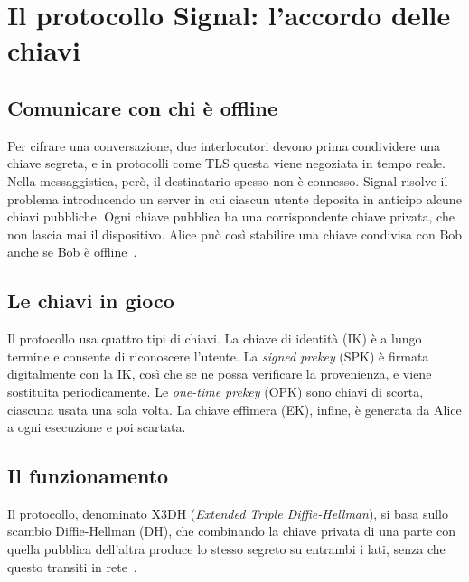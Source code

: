 \section{Il protocollo Signal: l'accordo delle chiavi}\label{sec:AccordoChiavi}

\subsection{Comunicare con chi è offline}\label{sec:offline}

Per cifrare una conversazione, due interlocutori devono prima condividere una chiave
segreta, e in protocolli come TLS questa viene negoziata in tempo reale. Nella
messaggistica, però, il destinatario spesso non è connesso. Signal risolve il problema
introducendo un server in cui ciascun utente deposita in anticipo alcune chiavi
pubbliche. Ogni chiave pubblica ha una corrispondente chiave privata, che non lascia
mai il dispositivo. Alice può così stabilire una chiave condivisa con Bob anche se Bob
è offline~\cite{x3dh,pqxdh}.

\subsection{Le chiavi in gioco}\label{sec:chiavi}

Il protocollo usa quattro tipi di chiavi. La chiave
di identità (IK) è a lungo termine e consente di riconoscere l'utente. La
\emph{signed prekey} (SPK) è firmata digitalmente con la IK, così che se ne possa
verificare la provenienza, e viene sostituita periodicamente. Le \emph{one-time prekey}
(OPK) sono chiavi di scorta, ciascuna usata una sola volta. La chiave effimera (EK),
infine, è generata da Alice a ogni esecuzione e poi scartata.

\subsection{Il funzionamento}\label{sec:x3dh}

Il protocollo, denominato X3DH (\emph{Extended Triple Diffie-Hellman}), si basa
sullo scambio Diffie-Hellman (DH), che combinando la chiave privata di una parte con
quella pubblica dell'altra produce lo stesso segreto su entrambi i lati, senza che
questo transiti in rete~\cite{x3dh}.

